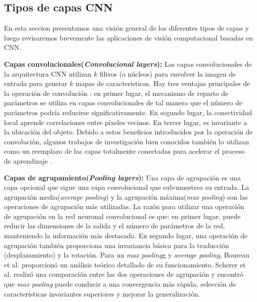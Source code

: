 \subsection {Tipos de capas CNN}

En esta seccion presentamos una visión general de los diferentes tipos de capas y luego revisaremos brevemente las aplicaciones de visión computacional basadas en CNN.

\textbf{Capas convolucionales(\textit{Convolucional layers}):} Las capas convolucionales de la arquitectura CNN utilizan $k$ filtros (o núcleos) para envolver la imagen de entrada para generar $k$ mapas de características. Hay tres ventajas principales de la operación de convolución \cite{Zeiler}: en primer lugar, el mecanismo de reparto de parámetros se utiliza en capas convolucionales de tal manera que el número de parámetros podría reducirse significativamente. En segundo lugar, la conectividad local aprende correlaciones entre píxeles vecinos. En tercer lugar, es invariante a la ubicación del objeto. Debido a estos beneficios introducidos por la operación de convolución, algunos trabajos de investigación bien conocidos también lo utilizan como un reemplazo de las capas totalmente conectadas para acelerar el proceso de aprendizaje \cite{Szegedy,Oquab}.

\textbf{Capas de agrupamiento(\textit{Pooling layers}):} Una capa de agrupación es una capa opcional que sigue una capa convolucional que sub-muestrea su entrada. La agrupación media(\textit{average pooling}) y la agrupación máxima(\textit{max pooling}) son las operaciones de agrupación más utilizadas. La razón para utilizar una operación de agrupación en la red neuronal convolucional es que: en primer lugar, puede reducir las dimensiones de la salida y el número de parámetros de la red, manteniendo la información más destacada. En segundo lugar, una operación de agrupación también proporciona una invariancia básica para la traducción (desplazamiento) y la rotación.  Para un \textit{max pooling}g y \textit{average pooling}, Boureau et al. \cite{Boureau} proporcionó un análisis teórico detallado de su funcionamiento. Scherer et al. \cite{Scherer} realizó una comparación entre las dos operaciones de agrupación y encontró que \textit{max pooling} puede conducir a una convergencia más rápida, selección de características invariantes superiores y mejorar la generalización.

